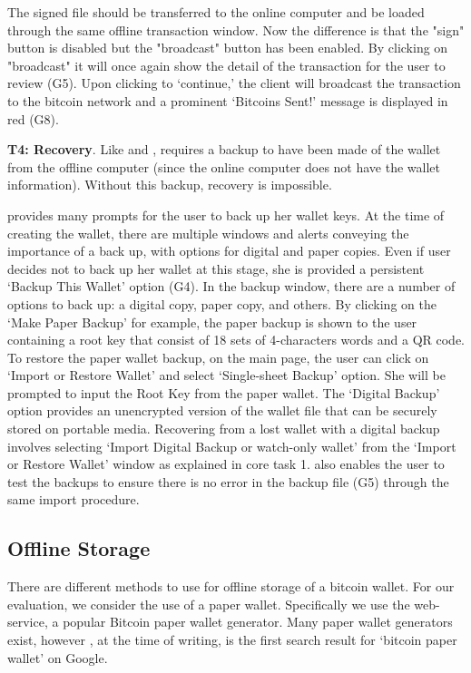 The signed file should be transferred to the online computer and be loaded through the same offline transaction window. Now the difference is that the "sign" button is disabled but the "broadcast" button has been enabled. By clicking on "broadcast" it will once again show the detail of the transaction for the user to review (G5). Upon clicking to `continue,' the client will broadcast the transaction to the bitcoin network and a prominent `Bitcoins Sent!' message is displayed in red (G8).

\textbf{T4: Recovery}.
Like \bitcoinclient and \multibit, \armory requires a backup to have been made of the wallet from the offline computer (since the online computer does not have the wallet information). Without this backup, recovery is impossible.

\armory provides many prompts for the user to back up her wallet keys. At the time of creating the wallet, there are multiple windows and alerts conveying the importance of a back up, with options for digital and paper copies. Even if user decides not to back up her wallet at this stage, she is provided a persistent `Backup This Wallet' option (G4). In the backup window, there are a number of options to back up: a digital copy, paper copy, and others. By clicking on the `Make Paper Backup' for example, the paper backup is shown to the user containing a root key that consist of 18 sets of 4-characters words and a QR code. To restore the paper wallet backup, on the main page, the user can click on `Import or Restore Wallet' and select `Single-sheet Backup' option. She will be prompted to input the Root Key from the paper wallet. The `Digital Backup' option provides an unencrypted version of the wallet file that can be securely stored on portable media. Recovering from a lost wallet with a digital backup involves selecting `Import Digital Backup or watch-only wallet' from the `Import or Restore Wallet' window as explained in core task 1. \armory also enables the user to test the backups to ensure there is no error in the backup file (G5) through the same import procedure.

\subsection{Offline Storage}
There are different methods to use for offline storage of a bitcoin wallet. For our evaluation, we consider the use of a paper wallet. Specifically we use the \paper web-service, a popular Bitcoin paper wallet generator. Many paper wallet generators exist, however \paper, at the time of writing, is the first search result for `bitcoin paper wallet' on Google.

